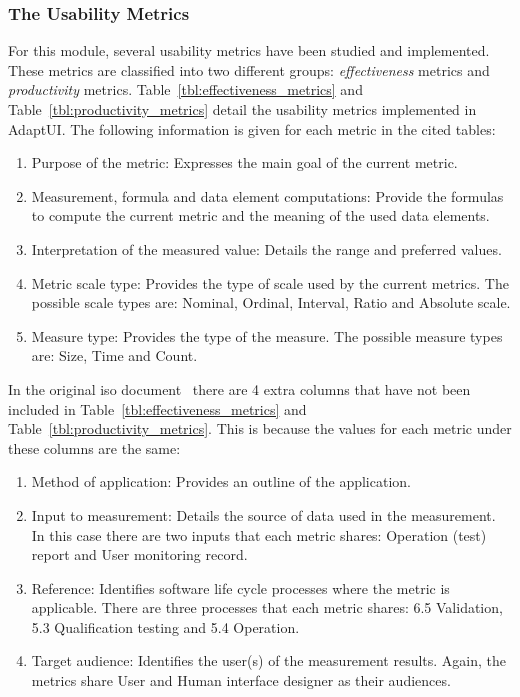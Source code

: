 

\subsubsection{The Usability Metrics}
\label{sec:usability_metrics}
For this module, several usability metrics have been studied and implemented.
These metrics are classified into two different groups: \textit{effectiveness}
metrics and \textit{productivity} metrics. Table~\ref{tbl:effectiveness_metrics}
and Table~\ref{tbl:productivity_metrics} detail the usability metrics implemented
in AdaptUI. The following information is given for each metric in the cited
tables:

\begin{enumerate}[label=\alph*)]
  \item Purpose of the metric: Expresses the main goal of the current metric.
  \item Measurement, formula and data element computations: Provide the formulas
  to compute the current metric and the meaning of the used data elements.
  \item Interpretation of the measured value: Details the range and preferred values.
  \item Metric scale type: Provides the type of scale used by the current metrics.
  The possible scale types are: Nominal, Ordinal, Interval, Ratio and Absolute
  scale.
  \item Measure type: Provides the type of the measure. The possible measure
  types are: Size, Time and Count.
\end{enumerate}

In the original \ac{iso} document~\citep{ISOIEC9126} there are 4 extra columns that
have not been included in Table~\ref{tbl:effectiveness_metrics} and
Table~\ref{tbl:productivity_metrics}. This is because the values for each metric
under these columns are the same:

\begin{enumerate}[label=\alph*)]
  \item Method of application: Provides an outline of the application. 
  
  \item Input to measurement: Details the source of data used in the measurement.
  In this case there are two inputs that each metric shares: Operation (test) 
  report and User monitoring record.
  
  \item Reference: Identifies software life cycle processes where the metric is
  applicable. There are three processes that each metric shares: 6.5 Validation,
  5.3 Qualification testing and 5.4 Operation.
  
  \item Target audience: Identifies the user(s) of the measurement results. Again,
  the metrics share User and Human interface designer as their audiences.
\end{enumerate}


